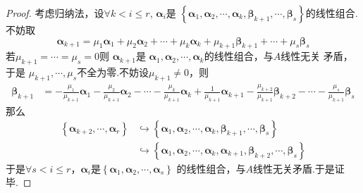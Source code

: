 {\begin{proof}
        考虑归纳法，设$\forall k < i \leqslant r$,
        $\bm{\alpha}_i$是
        $\left\{\bm{\alpha}_1,
            \bm{\alpha}_2,\cdots,\bm{\alpha}_k,
            \bm{\beta}_{k+1},\cdots,\bm{\beta}_s\right\}$的线性组合.
        不妨取
        \[
            \bm{\alpha}_{k+1}=\mu_{1}\bm{\alpha}_1+\mu_2\bm{\alpha}_2+\cdots+\mu_k\bm{\alpha}_k+
            \mu_{k+1}\bm{\beta}_{k+1}+\cdots+\mu_s\bm{\beta}_s
        \]
        若$\mu_{k+1}=\cdots=\mu_{s}=0$则
        $\bm{\alpha}_{k+1}$是
        $\bm{\alpha}_1,\bm{\alpha}_2,
            \cdots,\bm{\alpha}_k$的线性组合，与$A$线性无关
        矛盾，于是
        $\mu_{k+1},\cdots,\mu_s$不全为零.不妨设$\mu_{k+1}\neq 0$，则
        \begin{align*}
            \bm{\beta}_{k+1} & =
            -\frac{\mu_1}{\mu_{k+1}}\bm{\alpha}_1-
            \frac{\mu_2}{\mu_{k+1}}\bm{\alpha}_2-\cdots
            -\frac{\mu_k}{\mu_{k+1}}\bm{\alpha}_k+
            \frac{1}{\mu_{k+1}}\bm{\alpha}_{k+1}-
            \frac{\mu_{k+2}}{\mu_{k+1}}\bm{\beta}_{k+2}-
            \cdots-\frac{\mu_{s}}{\mu_{k+1}}\bm{\beta}_s
        \end{align*}
        那么
        \begin{align*}
            \left\{\bm{\alpha}_{k+2},\cdots,\bm{\alpha}_r\right\}
             & \hookrightarrow
            \left\{\bm{\alpha}_1,
            \bm{\alpha}_2,\cdots,\bm{\alpha}_k,
            \bm{\beta}_{k+1},\cdots,\bm{\beta}_s\right\} \\
             & \hookrightarrow
            \left\{\bm{\alpha}_1,
            \bm{\alpha}_2,\cdots,\bm{\alpha}_k,\bm{\alpha}_{k+1},
            \bm{\beta}_{k+2},\cdots,\bm{\beta}_s\right\}
        \end{align*}
        于是$\forall s < i \leqslant r$，$\bm{\alpha}_i$是$\left\{\bm{\alpha}_1,\bm{\alpha}_2,\cdots,\bm{\alpha}_s\right\}$
        的线性组合，与$A$线性无关矛盾.于是证毕.
    \end{proof}
}
